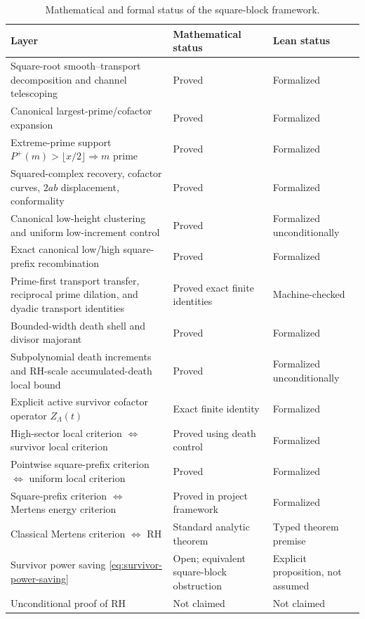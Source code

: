 \documentclass[11pt]{article}
\theoremstyle{definition}
\newcommand{\1}{\mathbf{1}}
\begin{document}
\begin{table}[htbp]
\centering
\caption{Mathematical and formal status of the square-block framework.}
\label{tab:status}
\small
\renewcommand{\arraystretch}{1.20}
\begin{tabular}{>{\raggedright\arraybackslash}p{}
                >{\raggedright\arraybackslash}p{}
                >{\raggedright\arraybackslash}p{}}
\toprule
Layer & Mathematical status & Lean status\\
\midrule
Square-root smooth--transport decomposition and channel telescoping
& Proved & Formalized\\
Canonical largest-prime/cofactor expansion
& Proved & Formalized\\
Extreme-prime support $P^+(m)>\lfloor x/2\rfloor\Rightarrow m$ prime
& Proved & Formalized\\
Squared-complex recovery, cofactor curves, $2ab$ displacement, conformality
& Proved & Formalized\\
Canonical low-height clustering and uniform low-increment control
& Proved & Formalized unconditionally\\
Exact canonical low/high square-prefix recombination
& Proved & Formalized\\
Prime-first transport transfer, reciprocal prime dilation, and dyadic transport identities
& Proved exact finite identities & Machine-checked\\
Bounded-width death shell and divisor majorant
& Proved & Formalized\\
Subpolynomial death increments and RH-scale accumulated-death local bound
& Proved & Formalized unconditionally\\
Explicit active survivor cofactor operator $Z_\Lambda(t)$
& Exact finite identity & Formalized\\
High-sector local criterion $\Longleftrightarrow$ survivor local criterion
& Proved using death control & Formalized\\
Pointwise square-prefix criterion $\Longleftrightarrow$ uniform local criterion
& Proved & Formalized\\
Square-prefix criterion $\Longleftrightarrow$ Mertens energy criterion
& Proved in project framework & Formalized\\
Classical Mertens criterion $\Longleftrightarrow$ RH
& Standard analytic theorem & Typed theorem premise\\
Survivor power saving \cref{eq:survivor-power-saving}
& Open; equivalent square-block obstruction & Explicit proposition, not assumed\\
Unconditional proof of RH
& Not claimed & Not claimed\\
\bottomrule
\end{tabular}
\end{table}
\end{document}
